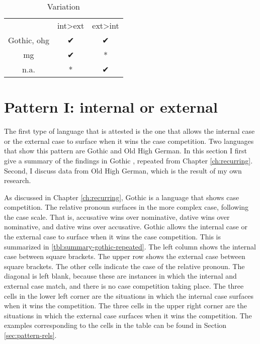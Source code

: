 \begin{table}[H]
 \center
 \caption {Variation}
  \begin{tabular}{ccc}
  \toprule
                    & \ac{int}>\ac{ext}  & \ac{ext}>\ac{int} \\
                    \cmidrule{2-3}
  Gothic, \ac{ohg}  & ✔                  & ✔                 \\
  \ac{mg}           & ✔                  & *                 \\
  n.a.              & *                  & ✔                 \\
  \bottomrule
\end{tabular}\label{tbl:competition-summary}
\end{table}

\section{Pattern I: internal or external}\label{sec:pattern-i}

The first type of language that is attested is the one that allows the internal case or the external case to surface when it wins the case competition. Two languages that show this pattern are Gothic and Old High German. In this section I first give a summary of the findings in Gothic \citep{harbert1978}, repeated from Chapter \ref{ch:recurring}. Second, I discuss data from Old High German, which is the result of my own research.

As discussed in Chapter \ref{ch:recurring}, Gothic is a language that shows case competition. The relative pronoun surfaces in the more complex case, following the case scale. That is, accusative wins over nominative, dative wins over nominative, and dative wins over accusative.
Gothic allows the internal case or the external case to surface when it wins the case competition. This is summarized in \ref{tbl:summary-gothic-repeated}. The left column shows the internal case between square brackets. The upper row shows the external case between square brackets. The other cells indicate the case of the relative pronoun. The diagonal is left blank, because these are instances in which the internal and external case match, and there is no case competition taking place.
The three cells in the lower left corner are the situations in which the internal case surfaces when it wins the competition. The three cells in the upper right corner are the situations in which the external case surfaces when it wins the competition.
The examples corresponding to the cells in the table can be found in Section \ref{sec:pattern-rels}.

